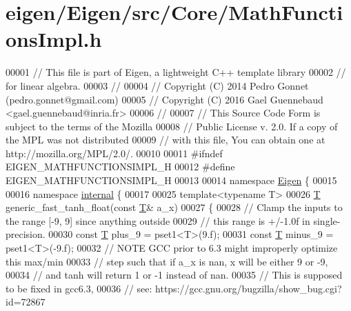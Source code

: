 \hypertarget{eigen_2_eigen_2src_2_core_2_math_functions_impl_8h_source}{}\section{eigen/\+Eigen/src/\+Core/\+Math\+Functions\+Impl.h}
\label{eigen_2_eigen_2src_2_core_2_math_functions_impl_8h_source}

\begin{DoxyCode}
00001 \textcolor{comment}{// This file is part of Eigen, a lightweight C++ template library}
00002 \textcolor{comment}{// for linear algebra.}
00003 \textcolor{comment}{//}
00004 \textcolor{comment}{// Copyright (C) 2014 Pedro Gonnet (pedro.gonnet@gmail.com)}
00005 \textcolor{comment}{// Copyright (C) 2016 Gael Guennebaud <gael.guennebaud@inria.fr>}
00006 \textcolor{comment}{//}
00007 \textcolor{comment}{// This Source Code Form is subject to the terms of the Mozilla}
00008 \textcolor{comment}{// Public License v. 2.0. If a copy of the MPL was not distributed}
00009 \textcolor{comment}{// with this file, You can obtain one at http://mozilla.org/MPL/2.0/.}
00010 
00011 \textcolor{preprocessor}{#ifndef EIGEN\_MATHFUNCTIONSIMPL\_H}
00012 \textcolor{preprocessor}{#define EIGEN\_MATHFUNCTIONSIMPL\_H}
00013 
00014 \textcolor{keyword}{namespace }\hyperlink{namespace_eigen}{Eigen} \{
00015 
00016 \textcolor{keyword}{namespace }\hyperlink{namespaceinternal}{internal} \{
00017 
00025 \textcolor{keyword}{template}<\textcolor{keyword}{typename} T>
00026 \hyperlink{group___sparse_core___module_class_eigen_1_1_triplet}{T} generic\_fast\_tanh\_float(\textcolor{keyword}{const} \hyperlink{group___sparse_core___module_class_eigen_1_1_triplet}{T}& a\_x)
00027 \{
00028   \textcolor{comment}{// Clamp the inputs to the range [-9, 9] since anything outside}
00029   \textcolor{comment}{// this range is +/-1.0f in single-precision.}
00030   \textcolor{keyword}{const} \hyperlink{group___sparse_core___module_class_eigen_1_1_triplet}{T} plus\_9 = pset1<T>(9.f);
00031   \textcolor{keyword}{const} \hyperlink{group___sparse_core___module_class_eigen_1_1_triplet}{T} minus\_9 = pset1<T>(-9.f);
00032   \textcolor{comment}{// NOTE GCC prior to 6.3 might improperly optimize this max/min}
00033   \textcolor{comment}{//      step such that if a\_x is nan, x will be either 9 or -9,}
00034   \textcolor{comment}{//      and tanh will return 1 or -1 instead of nan.}
00035   \textcolor{comment}{//      This is supposed to be fixed in gcc6.3,}
00036   \textcolor{comment}{//      see: https://gcc.gnu.org/bugzilla/show\_bug.cgi?id=72867}

\end{DoxyCode}
